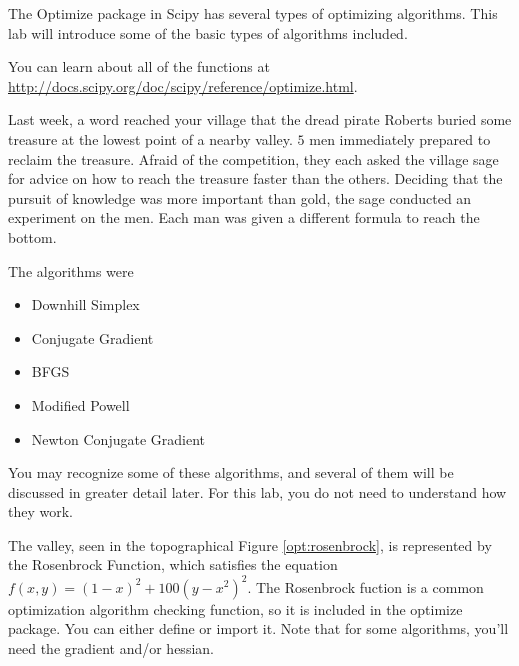 \label{lab:Optimization1}

The Optimize package in Scipy has several types of optimizing algorithms.
This lab will introduce some of the basic types of algorithms included.

You can learn about all of the functions at \url{http://docs.scipy.org/doc/scipy/reference/optimize.html}.


Last week, a word reached your village that the dread pirate Roberts buried some treasure at the lowest point of a nearby valley.
$5$ men immediately prepared to reclaim the treasure.
Afraid of the competition, they each asked the village sage for advice on how to reach the treasure faster than the others.
Deciding that the pursuit of knowledge was more important than gold, the sage conducted an experiment on the men.
Each man was given a different formula to reach the bottom.  

The algorithms were 
\begin{itemize}
\item Downhill Simplex
\item Conjugate Gradient
\item BFGS
\item Modified Powell
\item Newton Conjugate Gradient
\end{itemize}

You may recognize some of these algorithms, and several of them will be discussed in greater detail later.
For this lab, you do not need to understand how they work.


The valley, seen in the topographical Figure \ref{opt:rosenbrock}, is represented by the Rosenbrock Function, which satisfies the equation $f(x,y) = (1-x)^2 + 100(y-x^2)^2$.
The Rosenbrock fuction is a common optimization algorithm checking function, so it is included in the optimize package.
You can either define or import it.
Note that for some algorithms, you'll need the gradient and/or hessian.


